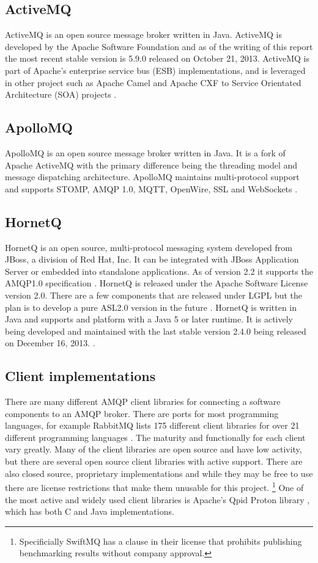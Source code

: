 \documentclass{thesis}
\begin{document}
\subsection{ActiveMQ}
ActiveMQ is an open source message broker written in Java.  ActiveMQ is developed by the Apache Software Foundation and as of the writing of this report the most recent stable version is 5.9.0 released on October 21, 2013.  ActiveMQ is part of Apache's enterprise service bus (ESB) implementations, and is leveraged in other project such as Apache Camel and Apache CXF to Service Orientated Architecture (SOA) projects \cite{ACTIVEMQ}.

\subsection{ApolloMQ}
ApolloMQ is an open source message broker written in Java.  It is a fork of Apache ActiveMQ with the primary difference being the threading model and message dispatching architecture.  ApolloMQ maintains multi-protocol support and supports STOMP, AMQP 1.0, MQTT, OpenWire, SSL and WebSockets \cite{APOLLO}.

\subsection{HornetQ}
HornetQ is an open source, multi-protocol messaging system developed from JBoss, a division of Red Hat, Inc.  It can be integrated with JBoss Application Server or embedded into standalone applications.  As of version 2.2 it supports the AMQP1.0 specification \cite{HORNETQ_ROADMAP}.  HornetQ is released under the Apache Software License version 2.0.  There are a few components that are released under LGPL but the plan is to develop a pure ASL2.0 version in the future .  HornetQ is written in Java and supports and platform with a Java 5 or later runtime.   It is actively being developed and maintained with the last stable version 2.4.0 being released on December 16, 2013. \cite{HORNETQ}.  

\subsection{Client implementations}
There are many different AMQP client libraries for connecting a software components to an AMQP broker.  There are ports for most programming languages, for example RabbitMQ lists 175 different client libraries for over 21 different programming languages \cite{RABBITMQ_CLIENTS}.  The maturity and functionally for each client vary greatly.  Many of the client libraries are open source and have low activity, but there are several open source client libraries with active support.  There are also closed source, proprietary implementations and while they may be free to use there are license restrictions that make them unusable for this project. \footnote{Specificially SwiftMQ has a clause in their license that prohibits publishing benchmarking results without company approval.} One of the most active and widely used client libraries is Apache's Qpid Proton library \cite{QPID_PROTON}, which has both C and Java implementations.
\end{document}
